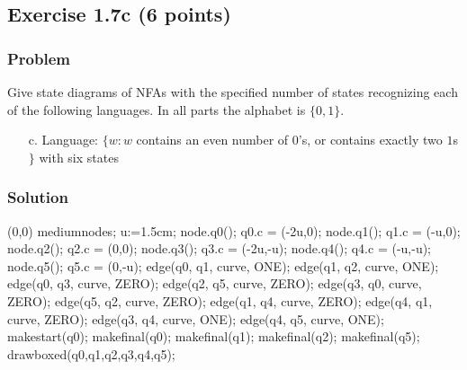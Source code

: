 \documentclass{article}
\begin{document}
\begin{empfile}
\subsection*{Exercise 1.7c (6 points)}

\subsubsection*{Problem}

Give state diagrams of NFAs with the specified number of states
recognizing each of the following languages. In all parts the
alphabet is $\{0,1\}$.

\begin{itemize}
\item[c.] Language: $\{w:w$ contains an even number of $0$'s, or
contains exactly two $1$s$\}$ with six states
\end{itemize}

\subsubsection*{Solution}
	\begin{center}
	\begin{emp}(0,0)
	mediumnodes;
	u:=1.5cm;
	node.q0(); q0.c = (-2u,0);
	node.q1(); q1.c = (-u,0);
	node.q2(); q2.c = (0,0);
	node.q3(); q3.c = (-2u,-u);
	node.q4(); q4.c = (-u,-u);
	node.q5(); q5.c = (0,-u);
	edge(q0, q1, curve, ONE);
	edge(q1, q2, curve, ONE);
	edge(q0, q3, curve, ZERO);
	edge(q2, q5, curve, ZERO);
	edge(q3, q0, curve, ZERO);
	edge(q5, q2, curve, ZERO);
	edge(q1, q4, curve, ZERO);
	edge(q4, q1, curve, ZERO);
	edge(q3, q4, curve, ONE);
	edge(q4, q5, curve, ONE);
	makestart(q0);
	makefinal(q0);
	makefinal(q1);
	makefinal(q2);
	makefinal(q5);
	drawboxed(q0,q1,q2,q3,q4,q5);
	\end{emp}
	\end{center}

\end{empfile}
\immediate{}
\end{document}
